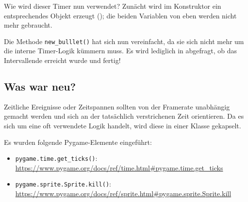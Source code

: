 Wie wird dieser Timer nun verwendet? Zunächt wird im Konstruktor ein entsprechendes Objekt erzeugt (); die beiden Variablen von eben werden nicht mehr gebraucht.


Die Methode \texttt{new\_bulllet()} hat sich nun vereinfacht, da sie sich nicht mehr um die interne Timer-Logik kümmern muss. Es wird lediglich in  abgefragt, ob das Intervallende erreicht wurde und fertig!



\subsection*{Was war neu?}
Zeitliche Ereignisse oder Zeitspannen sollten von der Framerate unabhängig gemacht werden und sich an der tatsächlich verstrichenen Zeit orientieren. Da es sich um eine oft verwendete Logik handelt, wird diese in einer Klasse gekapselt.

Es wurden folgende Pygame-Elemente eingeführt:
\begin{itemize}
	\item \texttt{pygame.time.get\_ticks()}:
	\\ 
    \url{https://www.pygame.org/docs/ref/time.html#pygame.time.get_ticks}
	
	\item \texttt{pygame.sprite.Sprite.kill()}:
	\\ 
	\url{https://www.pygame.org/docs/ref/sprite.html#pygame.sprite.Sprite.kill}

\end{itemize}